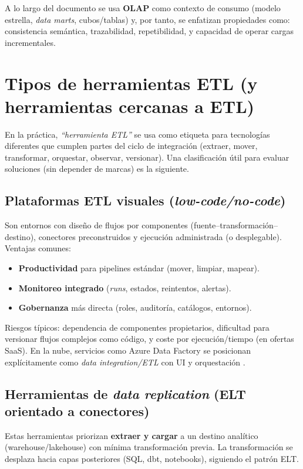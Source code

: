 \documentclass[12pt]{article}
\begin{document}
A lo largo del documento se usa \textbf{OLAP} como contexto de consumo (modelo estrella, \textit{data marts}, cubos/tablas) y, por tanto, se enfatizan propiedades como: consistencia semántica, trazabilidad, repetibilidad, y capacidad de operar cargas incrementales.

\section{Tipos de herramientas ETL (y herramientas cercanas a ETL)}
En la práctica, \textit{“herramienta ETL”} se usa como etiqueta para tecnologías diferentes que cumplen partes del ciclo de integración (extraer, mover, transformar, orquestar, observar, versionar). Una clasificación útil para evaluar soluciones (sin depender de marcas) es la siguiente.

\subsection{Plataformas ETL visuales (\textit{low-code/no-code})}
Son entornos con diseño de flujos por componentes (fuente--transformación--destino), conectores preconstruidos y ejecución administrada (o desplegable). Ventajas comunes:

\begin{itemize}[leftmargin=*]
  \item \textbf{Productividad} para pipelines estándar (mover, limpiar, mapear).
  \item \textbf{Monitoreo integrado} (\textit{runs}, estados, reintentos, alertas).
  \item \textbf{Gobernanza} más directa (roles, auditoría, catálogos, entornos).
\end{itemize}

Riesgos típicos: dependencia de componentes propietarios, dificultad para versionar flujos complejos como código, y coste por ejecución/tiempo (en ofertas SaaS). En la nube, servicios como Azure Data Factory se posicionan explícitamente como \textit{data integration/ETL} con UI y orquestación \cite{ms_adf_intro}.

\subsection{Herramientas de \textit{data replication} (ELT orientado a conectores)}
Estas herramientas priorizan \textbf{extraer y cargar} a un destino analítico (warehouse/lakehouse) con mínima transformación previa. La transformación se desplaza hacia capas posteriores (SQL, dbt, notebooks), siguiendo el patrón ELT.
\end{document}
